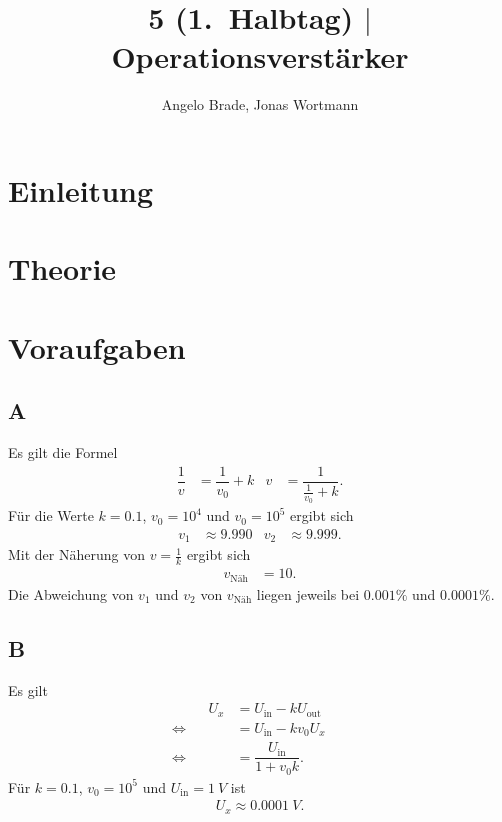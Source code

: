 \documentclass[a4paper,12pt]{article}
\numberwithin{equation}{section}
\begin{document}

\title{5 (1.\ Halbtag) $|$ Operationsverstärker}
\author{Angelo Brade, Jonas Wortmann}
\maketitle
{}


\newpage


\fancyhead[L]{\thepage}
\fancyfoot[C]{}

\tableofcontents


\newpage


\fancyhead[R]{\leftmark\\\rightmark}

\newpage
\section{Einleitung}

\newpage
\section{Theorie}

\newpage
\section{Voraufgaben}
\subsection{A}
Es gilt die Formel
\begin{align} 
        \dfrac{1}{v}&=\dfrac{1}{v_0}+k&v&=\dfrac{1}{\tfrac{1}{v_0}+k}
.\end{align} 
Für die Werte $k=0.1$, $v_0=10^4$ und $v_0=10^5$ ergibt sich
\begin{align} 
        v_1&\approx 9.990 & v_2&\approx 9.999
.\end{align} 
Mit der Näherung von $v=\tfrac{1}{k}$ ergibt sich
\begin{align} 
        v_\text{Näh}&=10
.\end{align} 
Die Abweichung von $v_1$ und $v_2$ von $v_\text{Näh}$ liegen jeweils bei $0.001\%$ und $0.0001\%$.

\subsection{B}
Es gilt
\begin{align} 
        &&&& U_x &= U_\text{in}-kU_\text{out} &&&& \\
        &&\Leftrightarrow && &= U_\text{in}-kv_0U_x &&&&\nonumber \\
        &&\Leftrightarrow && &= \dfrac{U_\text{in}}{1+v_0k}. &&&&
\end{align} 
Für $k=0.1$, $v_0=10^5$ und $U_\text{in}=\SI{1}{V}$ ist
\begin{align} 
        U_x\approx \SI{0.0001}{V}
.\end{align} 
\end{document}
